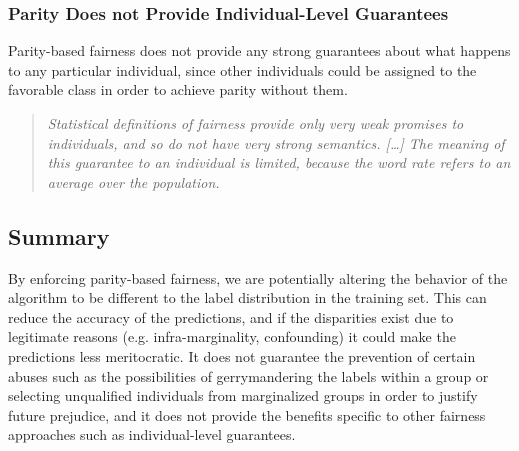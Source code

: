 \documentclass[11pt,dvipdfm]{article}
\begin{document}
\subsubsection{Parity Does not Provide Individual-Level Guarantees}
Parity-based fairness does not provide any strong guarantees about what happens to any particular individual, since other individuals could be assigned to the favorable class in order to achieve parity without them.  %
\begin{quote}
\emph{Statistical definitions of fairness provide only very weak promises to individuals, and so do not have very strong semantics. [\ldots] The meaning of this guarantee to an individual is limited, because the word \emph{rate} refers to an average over the population.} \cite{kearns2019average}
\end{quote}





\subsection{Summary}
By enforcing parity-based fairness, we are potentially altering the behavior of the algorithm to be different to the label distribution in the training set.  This can reduce the accuracy of the predictions, and if the disparities exist due to legitimate reasons (e.g. infra-marginality, confounding) it could make the predictions less meritocratic.  It does not guarantee the prevention of certain abuses such as the possibilities of gerrymandering the labels within a group or selecting unqualified individuals from marginalized groups in order to justify future prejudice, and it does not provide the benefits specific to other fairness approaches such as individual-level guarantees. 
\end{document}
